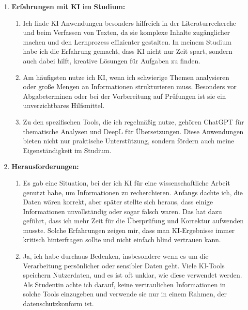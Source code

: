 \documentclass[a4paper,12pt]{article}
\begin{document}
\begin{enumerate}[label=\arabic*.)]
\item \textbf{Erfahrungen mit KI im Studium:} 
    \begin{enumerate}[label=\roman*)]
        \item Ich finde KI-Anwendungen besonders hilfreich in der Literaturrecherche
        und beim Verfassen von Texten, da sie komplexe Inhalte zugänglicher
        machen und den Lernprozess effizienter gestalten. In meinem Studium
        habe ich die Erfahrung gemacht, dass KI nicht nur Zeit spart, sondern
        auch dabei hilft, kreative Lösungen für Aufgaben zu finden.

        \item Am häufigsten nutze ich KI, wenn ich schwierige Themen analysieren oder
        große Mengen an Informationen strukturieren muss. Besonders vor
        Abgabeterminen oder bei der Vorbereitung auf Prüfungen ist sie ein
        unverzichtbares Hilfsmittel.

        \item Zu den spezifischen Tools, die ich regelmäßig nutze, gehören ChatGPT für
        thematische Analysen und DeepL für Übersetzungen. Diese Anwendungen
        bieten nicht nur praktische Unterstützung, sondern fördern auch meine
        Eigenständigkeit im Studium.
    \end{enumerate}

    
    \item \textbf{Herausforderungen:}
    \begin{enumerate}[label=\roman*)]
        \item Es gab eine Situation, bei der ich KI für eine
        wissenschaftliche Arbeit genutzt habe, um Informationen zu
        recherchieren. Anfangs dachte ich, die Daten wären korrekt, aber später
        stellte sich heraus, dass einige Informationen unvollständig oder sogar
        falsch waren. Das hat dazu geführt, dass ich mehr Zeit für die
        Überprüfung und Korrektur aufwenden musste. Solche Erfahrungen
        zeigen mir, dass man KI-Ergebnisse immer kritisch hinterfragen sollte und
        nicht einfach blind vertrauen kann.

        \item Ja, ich habe durchaus Bedenken, insbesondere wenn es um die
        Verarbeitung persönlicher oder sensibler Daten geht. Viele KI-Tools
        speichern Nutzerdaten, und es ist oft unklar, wie diese verwendet werden.
        Als Studentin achte ich darauf, keine vertraulichen Informationen in solche
        Tools einzugeben und verwende sie nur in einem Rahmen, der
        datenschutzkonform ist.
    \end{enumerate}
    

\end{enumerate}
\end{document}
